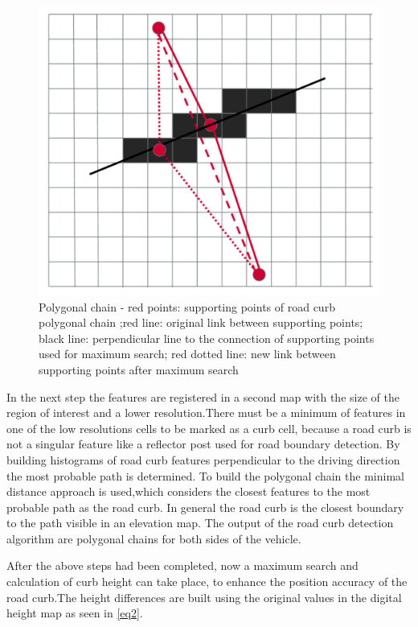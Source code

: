 \begin{figure}[ht]
	\centering
    \includegraphics[scale = 0.3]{pictures/polygonal_chain.pdf}
	\caption{Polygonal chain - red points: supporting points of road curb polygonal chain ;red line: original link between supporting points; black line: perpendicular line to the connection of supporting points used for maximum search; red dotted line: new link between supporting points after maximum search \cite{stereo}}
	\label{fig7}
\end{figure}


In the next step the features are registered in a second map with the size of the region of interest and a lower resolution.There must be a minimum of features in one of the low resolutions cells to be marked as a curb cell, because a road curb is not a singular feature like a reflector post used for road boundary detection. By building histograms of road curb features perpendicular to the driving direction the most probable path is determined. To build the polygonal chain the minimal distance approach is used,which considers the closest features to the most probable path as the road curb. In general the road curb is the closest boundary to the path visible in an elevation map. The output of the road curb detection algorithm are polygonal chains for both sides of the vehicle.

After the above steps had been completed, now a maximum search and calculation of curb height can take place, to enhance the position accuracy of the road curb.The height differences are built using the original values in the digital height map as seen in \ref{eq2}.


